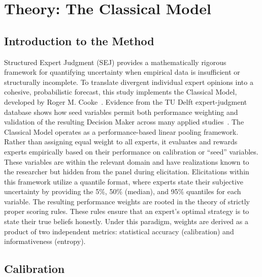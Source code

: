 \chapter{Theory: The Classical Model}
\label{chapter:theory}

\section{Introduction to the Method}
\label{sec:intro_classical_model}

Structured Expert Judgment (SEJ) provides a mathematically rigorous framework for quantifying uncertainty when empirical data is insufficient or structurally incomplete. To translate divergent individual expert opinions into a cohesive, probabilistic forecast, this study implements the Classical Model, developed by Roger M. Cooke~\cite{cooke1991experts}. Evidence from the TU Delft expert-judgment database shows how seed variables permit both performance weighting and validation of the resulting Decision Maker across many applied studies~\cite{cookeGoossens2008,colsonCooke2018}. The Classical Model operates as a performance-based linear pooling framework. Rather than assigning equal weight to all experts, it evaluates and rewards experts empirically based on their performance on calibration or ``seed'' variables. These variables are within the relevant domain and have realizations known to the researcher but hidden from the panel during elicitation.
Elicitations within this framework utilize a quantile format, where experts state their subjective uncertainty by providing the 5\%, 50\% (median), and 95\% quantiles for each variable. The resulting performance weights are rooted in the theory of strictly proper scoring rules. These rules ensure that an expert’s optimal strategy is to state their true beliefs honestly. Under this paradigm, weights are derived as a product of two independent metrics: statistical accuracy (calibration) and informativeness (entropy).

\section{Calibration}
\label{sec:calibration_score}

